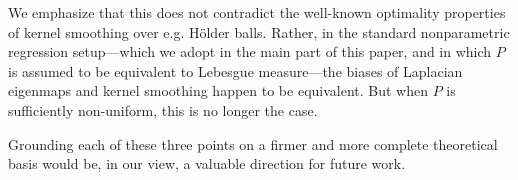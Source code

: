 \documentclass[aos]{imsart}
\theoremstyle{plain}
\theoremstyle{definition}
\theoremstyle{remark}
\newcommand{\1}{\mathbf{1}}
\begin{document}
\begin{itemize}
	We emphasize that this does not contradict the well-known optimality properties of kernel smoothing over e.g. H\"{o}lder balls. Rather, in the standard nonparametric regression setup---which we adopt in the main part of this paper, and in which $P$ is assumed to be equivalent to Lebesgue measure---the biases of Laplacian eigenmaps and kernel smoothing happen to be equivalent. But when $P$ is sufficiently non-uniform, this is no longer the case.
\end{itemize}
Grounding each of these three points on a firmer and more complete theoretical basis would be, in our view, a valuable direction for future work.

%

\begin{supplement}
\end{supplement}



\end{document}
